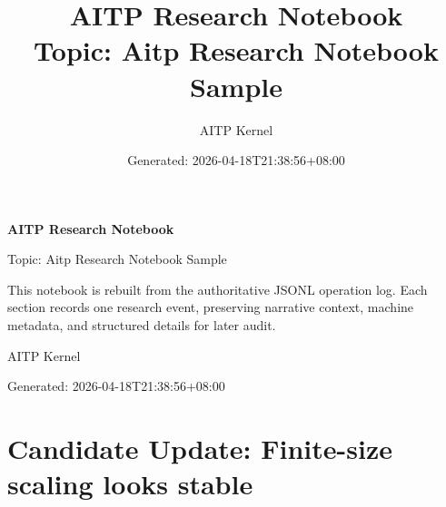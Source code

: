\documentclass[11pt,a4paper]{article}
\title{AITP Research Notebook\\[0.5em]
\large Topic: Aitp Research Notebook Sample}
\author{AITP Kernel}
\date{Generated: 2026-04-18T21:38:56+08:00}
\begin{document}
\begin{titlepage}
\thispagestyle{empty}
\vspace*{0.12\textheight}

{\Huge\bfseries\color{ink} AITP Research Notebook\par}
\vspace{0.8em}
{\Large\color{muted} Topic: Aitp Research Notebook Sample\par}
\vspace{1.8em}

\begin{tcolorbox}[
  enhanced,
  width=0.92\textwidth,
  colback=softfill,
  colframe=linecolor,
  boxrule=0.6pt,
  arc=1.5mm,
  left=2.5mm,
  right=2.5mm,
  top=2mm,
  bottom=2mm
]
\small\color{ink}
This notebook is rebuilt from the authoritative JSONL operation log.
Each section records one research event, preserving narrative context,
machine metadata, and structured details for later audit.
\end{tcolorbox}

\vfill
{\large\color{ink} AITP Kernel\par}
\vspace{0.4em}
{\normalsize\color{muted} Generated: 2026-04-18T21:38:56+08:00\par}
\end{titlepage}

\tableofcontents
\clearpage
{}
\section{Candidate Update: Finite-size scaling looks stable}
\end{document}
